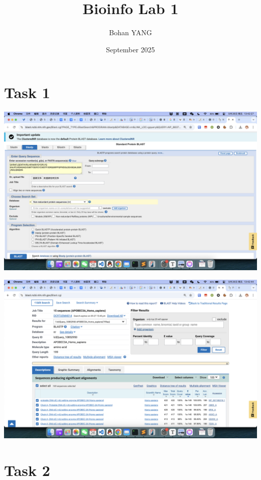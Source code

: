 \documentclass{article}
\title{Bioinfo Lab 1}
\author{Bohan YANG}
\date{September 2025}
\begin{document}
\maketitle

\section{Task 1}

\begin{center}
    \includegraphics[width=1\textwidth]{../images/task1/image1.png}
\end{center}
\begin{center}
    \includegraphics[width=1\textwidth]{../images/task1/image2.png}
\end{center}

\section{Task 2}
\end{document}

